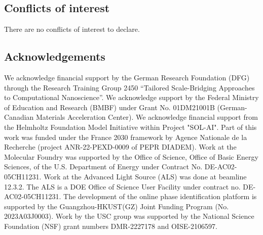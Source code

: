 \documentclass[a4paper]{article}
\begin{document}
\subsection*{Conflicts of interest}
There are no conflicts of interest to declare.

\subsection*{Acknowledgements}
We acknowledge financial support by the German Research Foundation (DFG) through the Research Training Group 2450 “Tailored Scale-Bridging Approaches to Computational Nanoscience”. We acknowledge support by the Federal Ministry of Education and Research (BMBF) under Grant No. 01DM21001B (German-Canadian Materials Acceleration Center). We acknowledge financial support from the Helmholtz Foundation Model Initiative within Project "SOL-AI". Part of this work was funded under the France 2030 framework by Agence Nationale de la Recherche (project ANR-22-PEXD-0009 of PEPR DIADEM). Work at the Molecular Foundry was supported by the Office of Science, Office of Basic Energy Sciences, of the U.S. Department of Energy under Contract No. DE-AC02-05CH11231. Work at the Advanced Light Source (ALS) was done at beamline 12.3.2. The ALS is a DOE Office of Science User Facility under contract no. DE-AC02-05CH11231. The development of the online phase identification platform is supported by the Guangzhou-HKUST(GZ) Joint Funding Program (No. 2023A03J0003). Work by the USC group was supported by the National Science Foundation (NSF) grant numbers DMR-2227178 and OISE-2106597. 




\printnomenclature

\clearpage



\end{document}
